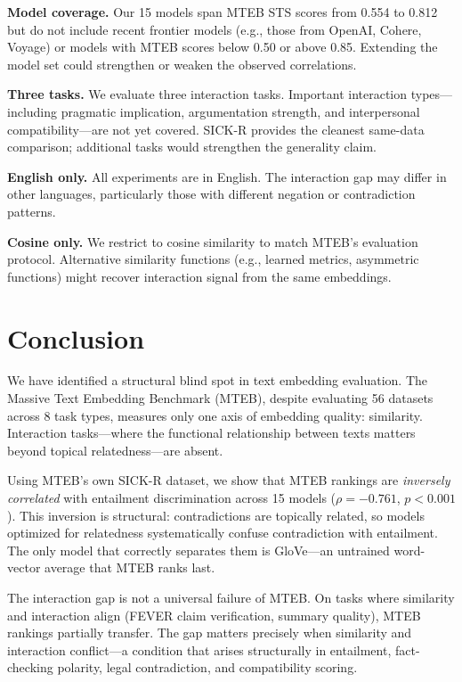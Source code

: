 \documentclass{article}
\begin{document}
\textbf{Model coverage.} Our 15 models span MTEB STS scores from 0.554 to 0.812 but do not include recent frontier models (e.g., those from OpenAI, Cohere, Voyage) or models with MTEB scores below 0.50 or above 0.85. Extending the model set could strengthen or weaken the observed correlations.

\textbf{Three tasks.} We evaluate three interaction tasks. Important interaction types---including pragmatic implication, argumentation strength, and interpersonal compatibility---are not yet covered. SICK-R provides the cleanest same-data comparison; additional tasks would strengthen the generality claim.

\textbf{English only.} All experiments are in English. The interaction gap may differ in other languages, particularly those with different negation or contradiction patterns.

\textbf{Cosine only.} We restrict to cosine similarity to match MTEB's evaluation protocol. Alternative similarity functions (e.g., learned metrics, asymmetric functions) might recover interaction signal from the same embeddings.

\section{Conclusion}
\label{sec:conclusion}

We have identified a structural blind spot in text embedding evaluation. The Massive Text Embedding Benchmark (MTEB), despite evaluating 56 datasets across 8 task types, measures only one axis of embedding quality: similarity. Interaction tasks---where the functional relationship between texts matters beyond topical relatedness---are absent.

Using MTEB's own SICK-R dataset, we show that MTEB rankings are \emph{inversely correlated} with entailment discrimination across 15 models ($\rho = -0.761$, $p < 0.001$). This inversion is structural: contradictions are topically related, so models optimized for relatedness systematically confuse contradiction with entailment. The only model that correctly separates them is GloVe---an untrained word-vector average that MTEB ranks last.

The interaction gap is not a universal failure of MTEB. On tasks where similarity and interaction align (FEVER claim verification, summary quality), MTEB rankings partially transfer. The gap matters precisely when similarity and interaction conflict---a condition that arises structurally in entailment, fact-checking polarity, legal contradiction, and compatibility scoring.
\end{document}
